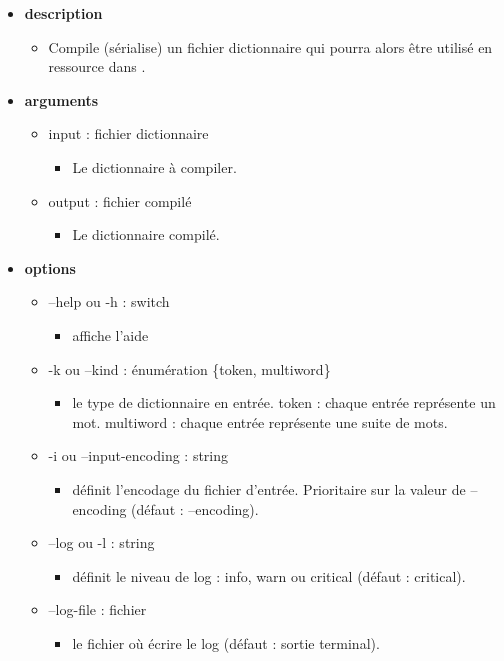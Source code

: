 \documentclass[manual-fr.tex]{subfiles}
\begin{document}
\begin{itemize}
    \item[] \textbf{description}
        \begin{itemize}
            \item[] Compile (sérialise) un fichier dictionnaire qui pourra alors être utilisé en ressource dans \SEM.
        \end{itemize}
    \item[] \textbf{arguments}
        \begin{itemize}
            \item[] input : fichier dictionnaire
                \begin{itemize}
                    \item[] Le dictionnaire à compiler.
                \end{itemize}
            \item[] output : fichier compilé
                \begin{itemize}
                    \item[] Le dictionnaire compilé.
                \end{itemize}
        \end{itemize}
    \item[] \textbf{options}
        \begin{itemize}
            \item[] --help ou -h : switch
                \begin{itemize}
                    \item[] affiche l'aide
                \end{itemize}
            \item[] -k ou --kind : énumération \{token, multiword\}
                \begin{itemize}
                    \item[] le type de dictionnaire en entrée. token : chaque entrée représente un mot. multiword : chaque entrée représente une suite de mots.
                \end{itemize}
            \item[] -i ou --input-encoding : string
                \begin{itemize}
                    \item[] définit l'encodage du fichier d'entrée. Prioritaire sur la valeur de --encoding (défaut : --encoding).
                \end{itemize}
            \item[] --log ou -l : string
                \begin{itemize}
                    \item[] définit le niveau de log : info, warn ou critical (défaut : critical).
                \end{itemize}
            \item[] --log-file : fichier
                \begin{itemize}
                    \item[] le fichier où écrire le log (défaut : sortie terminal).
                \end{itemize}
        \end{itemize}
\end{itemize}
\end{document}
